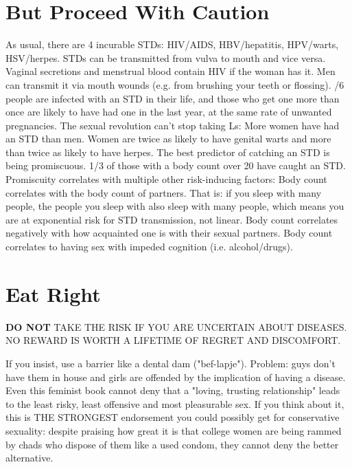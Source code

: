 \section{But Proceed With Caution}
\begin{outline}
\1 As usual, there are 4 incurable STDs: HIV/AIDS, HBV/hepatitis, HPV/warts, HSV/herpes.
\1 STDs can be transmitted from vulva to mouth and vice versa.
	\2 Vaginal secretions and menstrual blood contain HIV if the woman has it.
	\2 Men can transmit it via mouth wounds (e.g. from brushing your teeth or flossing).
/6 people are infected with an STD in their life, and those who get one more than once are likely to have had one in the last year, at the same rate of unwanted pregnancies.
\1 The sexual revolution can't stop taking Ls:
	\2 More women have had an STD than men.
	\2 Women are twice as likely to have genital warts and more than twice as likely to have herpes.
	\2 The best predictor of catching an STD is being promiscuous. 1/3 of those with a body count over 20 have caught an STD.
\1 Promiscuity correlates with multiple other risk-inducing factors:
	\2 Body count correlates with the body count of partners. That is: if you sleep with many people, the people you sleep with also sleep with many people, which means you are at exponential risk for STD transmission, not linear.
	\2 Body count correlates negatively with how acquainted one is with their sexual partners.
	\2 Body count correlates to having sex with impeded cognition (i.e. alcohol/drugs).
\end{outline}

\section{Eat Right}
\begin{mdframed}
\textbf{DO NOT} TAKE THE RISK IF YOU ARE UNCERTAIN ABOUT DISEASES. NO REWARD IS WORTH A LIFETIME OF REGRET AND DISCOMFORT.
\end{mdframed}

\begin{outline}
\1 If you insist, use a barrier like a dental dam ("bef-lapje"). Problem: guys don't have them in house and girls are offended by the implication of having a disease.
\1 Even this feminist book cannot deny that a "loving, trusting relationship" leads to the least risky, least offensive and most pleasurable sex. If you think about it, this is THE STRONGEST endorsement you could possibly get for conservative sexuality: despite praising how great it is that college women are being rammed by chads who dispose of them like a used condom, they cannot deny the better alternative.
\end{outline}

